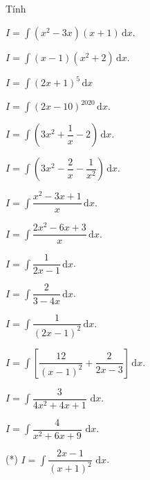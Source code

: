 \begin{vd}%
	Tính
    \begin{listEX}[3]
        \item $I=\displaystyle\int{(x^2-3x)(x+1)\mathrm{\,d}x}$.
        \item $I=\displaystyle\int{(x-1)(x^2+2)\mathrm{\,d}x}$.
        \item $I=\displaystyle\int{{{(2x+1)}^5}\mathrm{\,d}x}$
        \item $I=\displaystyle\int{{{(2x-10)}^{2020}}\mathrm{\,d}x}$.
        \item $I=\displaystyle\int{\left( 3x^2+\dfrac{1}{x}-2 \right)\mathrm{\,d}x}$.
        \item $I=\displaystyle\int{\left( 3x^2-\dfrac{2}{x}-\dfrac{1}{x^2} \right)\mathrm{\,d}x}$.
        \item $I=\displaystyle\int{\dfrac{x^2-3x+1}{x}\mathrm{\,d}x}$.
        \item $I=\displaystyle\int{\dfrac{2x^2-6x+3}{x}\mathrm{\,d}x}$.
        \item $I=\displaystyle\int{\dfrac{1}{2x-1}\mathrm{\,d}x}$.
        \item $I=\displaystyle\int{\dfrac{2}{3-4x}\mathrm{\,d}x}$.
        \item $I=\displaystyle\int{\dfrac{1}{{{\left( 2x-1 \right)}^2}}\mathrm{\,d}x}$.
        \item $I=\displaystyle\int{\left[ \dfrac{12}{{{\left( x-1 \right)}^2}}+\dfrac{2}{2x-3} \right]\mathrm{\,d}x}$.
        \item $I=\displaystyle\int{\dfrac{3}{4x^2+4x+1}\textrm{ d}x}$.
        \item $I=\displaystyle\int{\dfrac{4}{x^2+6x+9}\textrm{ d}x}$.
            \item (*) $I=\displaystyle\int{\dfrac{2x-1}{{{\left( x+1 \right)}^2}}\textrm{ d}x}$.
    \end{listEX}
\end{vd}
